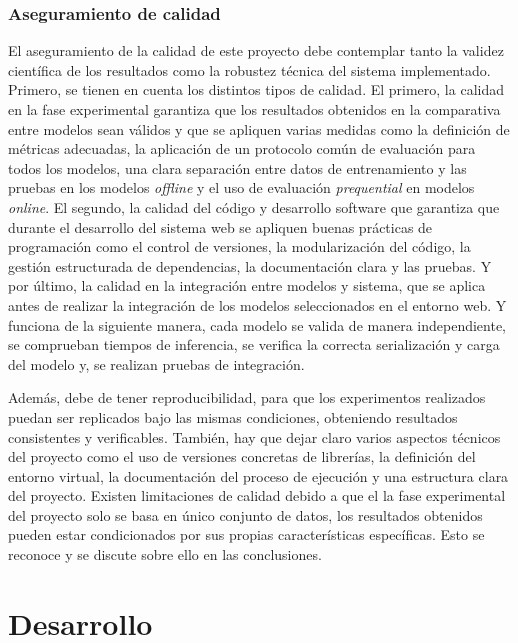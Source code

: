 \documentclass[12pt,a4paper]{report}
\begin{document}
\section{Aseguramiento de calidad}

El aseguramiento de la calidad de este proyecto debe contemplar tanto la validez científica de los resultados como la robustez técnica del sistema implementado. Primero, se tienen en cuenta los distintos tipos de calidad. El primero, la calidad en la fase experimental garantiza que los resultados obtenidos en la comparativa entre modelos sean válidos y que se apliquen varias medidas como la definición de métricas adecuadas, la aplicación de un protocolo común de evaluación para todos los modelos, una clara separación entre datos de entrenamiento y las pruebas en los modelos \emph{offline} y el uso de evaluación \emph{prequential} en modelos \emph{online}. El segundo, la calidad del código y desarrollo software que garantiza que durante el desarrollo del sistema web se apliquen buenas prácticas de programación como el control de versiones, la modularización del código, la gestión estructurada de dependencias, la documentación clara y las pruebas. Y por último, la calidad en la integración entre modelos y sistema, que se aplica antes de realizar la integración de los modelos seleccionados en el entorno web. Y funciona de la siguiente manera, cada modelo se valida de manera independiente, se comprueban tiempos de inferencia, se verifica la correcta serialización y carga del modelo y, se realizan pruebas de integración.

Además, debe de tener reproducibilidad, para que los experimentos realizados puedan ser replicados bajo las mismas condiciones, obteniendo resultados consistentes y verificables. También,  hay que dejar claro varios aspectos técnicos del proyecto como el uso de versiones concretas de librerías, la definición del entorno virtual, la documentación del proceso de ejecución y una estructura clara del proyecto. Existen limitaciones de calidad debido a que el la fase experimental del proyecto solo se basa en único conjunto de datos, los resultados obtenidos pueden estar condicionados por sus propias características específicas. Esto se reconoce y se discute sobre ello en las conclusiones.


\part{Desarrollo}
\end{document}
